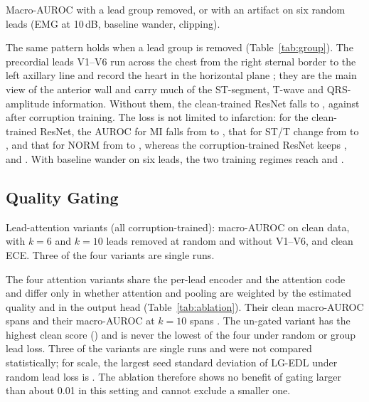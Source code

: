 \begin{table}[t]
\centering
\caption{Macro-AUROC with a lead group removed, or with an artifact on six random leads (EMG at 10\,dB, baseline
wander, clipping).}
\label{tab:group}
\begin{adjustbox}{max width=\columnwidth}\end{adjustbox}
\end{table}

The same pattern holds when a lead group is removed (Table~\ref{tab:group}). The precordial leads V1--V6 run across
the chest from the right sternal border to the left axillary line and record the heart in the horizontal plane
\cite{kligfield2007recommendations}; they are the main view of the anterior wall and carry much of the ST-segment,
T-wave and QRS-amplitude information. Without them, the clean-trained ResNet falls to \aucResCleanPrec, against
\aucResDropPrec{} after corruption training. The loss is not limited to infarction: for the clean-trained ResNet, the
AUROC for MI falls from \pcResCleanMi{} to \pcResCleanMiPrec, that for ST/T change from \pcResCleanSttc{} to
\pcResCleanSttcPrec, and that for NORM from \pcResCleanNorm{} to \pcResCleanNormPrec, whereas the corruption-trained
ResNet keeps \pcResDropMiPrec, \pcResDropSttcPrec{} and \pcResDropNormPrec. With baseline wander on six leads, the two
training regimes reach \aucResCleanWanderSix{} and \aucResDropWanderSix.

\subsection{Quality Gating}
\label{sec:res-gating}

\begin{table}[t]
\centering
\caption{Lead-attention variants (all corruption-trained): macro-AUROC on clean data, with $k=6$ and $k=10$ leads
removed at random and without V1--V6, and clean ECE. Three of the four variants are single runs.}
\label{tab:ablation}
\begin{adjustbox}{max width=\columnwidth}\end{adjustbox}
\end{table}

The four attention variants share the per-lead encoder and the attention code and differ only in whether attention
and pooling are weighted by the estimated quality and in the output head (Table~\ref{tab:ablation}). Their clean
macro-AUROC spans \ablRangeClean{} and their macro-AUROC at $k=10$ spans \ablRangeKTen. The un-gated variant has the
highest clean score (\aucResAttnClean) and is never the lowest of the four under random or group lead loss. Three of
the variants are single runs and were not compared statistically; for scale, the largest seed standard deviation of
LG-EDL under random lead loss is \seedStdLgEdlMaxLoss. The ablation therefore shows no benefit of gating larger than
about 0.01 in this setting and cannot exclude a smaller one.

